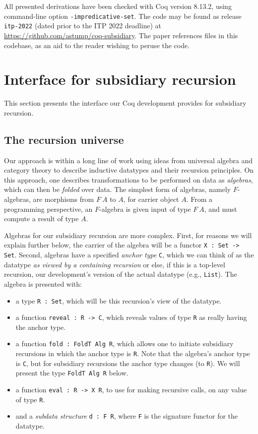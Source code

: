 \documentclass[a4paper,USenglish]{lipics-v2021}
\begin{document}
All presented derivations have been checked with Coq version 8.13.2,
using command-line option \verb|-impredicative-set|.  The code may be
found as release \verb|itp-2022| (dated prior to the ITP 2022
deadline) at \url{https://github.com/astump/coq-subsidiary}.  The
paper references files in this codebase, as an aid to the reader
wishing to peruse the code.

\section{Interface for subsidiary recursion}
\label{sec:interface}

This section presents the interface our Coq development provides
for subsidiary recursion.

\subsection{The recursion universe}
\label{sec:recu}

Our approach is within a long line of work using ideas from universal
algebra and category theory to describe inductive datatypes and their
recursion principles.  On this approach, one describes transformations
to be performed on data as \emph{algebras}, which can then be
\textit{folded} over data.  The simplest form of algebras, namely
$F$-algebras, are morphisms from $F\ A$ to $A$, for carrier object
$A$.  From a programming perspective, an $F$-algebra is given input of
type $F\ A$, and must compute a result of type $A$.

Algebras for our subsidiary recursion are more complex.  First, for
reasons we will explain further below, the carrier of the algebra will
be a functor \verb|X : Set -> Set|.  Second, algebras have a specified
\emph{anchor type} \verb|C|, which we can think of as the datatype
\emph{as viewed by a containing recursion} or else, if this is a
top-level recursion, our development's version of the actual datatype
(e.g., \verb|List|).  The algebra is presented with:

\begin{itemize}
\item a type \verb|R : Set|, which will be this recursion's view of the datatype.
\item a function \verb|reveal : R -> C|, which reveals values of type \verb|R| as really having the anchor type.  
\item a function \verb|fold : FoldT Alg R|, which allows one to initiate subsidiary recursions in which the anchor type is \verb|R|.  Note that the algebra's anchor type is \verb|C|, but for subsidiary recursions the anchor type changes (to \verb|R|). We will present the type \verb|FoldT Alg R| below.
\item a function \verb|eval : R -> X R|, to use for making recursive calls, on any value of type \verb|R|.
\item and a \emph{subdata structure} \verb|d : F R|, where \verb|F| is the signature functor for the datatype.
\end{itemize}
\end{document}
